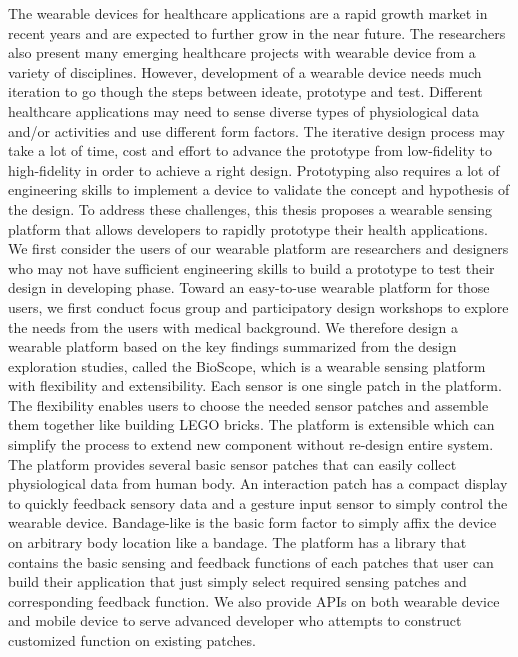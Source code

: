 
\begin{abstracten}
\noindent

The wearable devices for healthcare applications are a rapid growth market in recent years and are expected to further grow in the near future. The researchers also present many emerging healthcare projects with wearable device from a variety of disciplines. However, development of a wearable device needs much iteration to go though the steps between ideate, prototype and test. Different healthcare applications may need to sense diverse types of physiological data and/or activities and use different form factors. The iterative design process may take a lot of time, cost and effort to advance the prototype from low-fidelity to high-fidelity in order to achieve a right design. Prototyping also requires a lot of engineering skills to implement a device to validate the concept and hypothesis of the design. To address these challenges, this thesis proposes a wearable sensing platform that allows developers to rapidly prototype their health applications. We first consider the users of our wearable platform are researchers and designers who may not have sufficient engineering skills to build a prototype to test their design in developing phase. Toward an easy-to-use wearable platform for those users, we first conduct focus group and participatory design workshops to explore the needs from the users with medical background. We therefore design a wearable platform based on the key findings summarized from the design exploration studies, called the BioScope, which is a wearable sensing platform with flexibility and extensibility. Each sensor is one single patch in the platform. The flexibility enables users to choose the needed sensor patches and assemble them together like building LEGO bricks. The platform is extensible which can simplify the process to extend new component without re-design entire system. The platform provides several basic sensor patches that can easily collect physiological data from human body. An interaction patch has a compact display to quickly feedback sensory data and a gesture input sensor to simply control the wearable device. Bandage-like is the basic form factor to simply affix the device on arbitrary body location like a bandage. The platform has a library that contains the basic sensing and feedback functions of each patches that user can build their application that just simply select required sensing patches and corresponding feedback function. We also provide APIs on both wearable device and mobile device to serve advanced developer who attempts to construct customized function on existing patches.

\end{abstracten}

